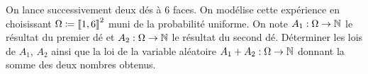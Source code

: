 \documentclass{magnolia}
\begin{document}


\begin{exoUnique}
\exo On lance successivement deux dés à 6 faces. On modélise cette expérience en choisissant $\Omega\coloneqq\left\llbracket 1,6\right\rrbracket^2$
  muni de la probabilité uniforme. On note $A_1:\Omega\to\mathbb{N}$ le résultat du premier dé et
  $A_2:\Omega\to\mathbb{N}$ le résultat du second dé. Déterminer les lois de $A_1$, $A_2$ ainsi que
  la loi de la variable aléatoire $A_1+A_2:\Omega\to\mathbb{N}$ donnant la somme des deux nombres
  obtenus.
\end{exoUnique}


\end{document}
